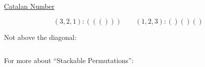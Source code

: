 \begin{frame}{}
  \centerline{\Large \href{https://en.wikipedia.org/wiki/Catalan\_number}{Catalan Number}}

  \vspace{0.50cm}
  \pause
  \begin{description}[Parenthesis]
    \item[Parenthesis] 
      \[
	(3,2,1): ((())) \qquad (1,2,3): ()()()
      \]
    \pause
    \item[Grid Paths] Not above the diagonal:
      \begin{columns}
      \end{columns}
  \end{description}
\end{frame}

\begin{frame}{}
  \centerline{\Large For more about ``Stackable Permutations'':}

  \vspace{0.30cm}
  \begin{columns}
  \end{columns}
\end{frame}

